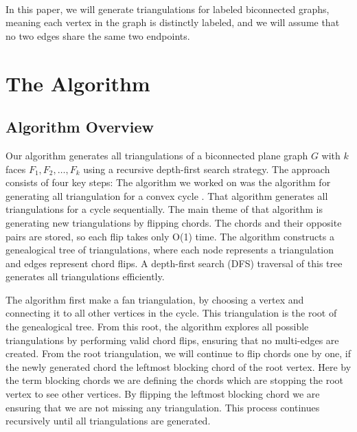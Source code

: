 ﻿﻿\documentclass[12pt,a4paper]{article}
\theoremstyle{definition}
\theoremstyle{remark}
\begin{document}
In this paper, we will generate triangulations for labeled biconnected graphs, meaning each vertex in the graph is distinctly labeled, and we will assume that no two edges share the same two endpoints.



\section{The Algorithm}
\label{sec:algorithm}
\subsection{Algorithm Overview}

Our algorithm generates all triangulations of a biconnected plane graph $G$ with $k$ faces $F_1, F_2, \ldots, F_k$ using a recursive depth-first search strategy. The approach consists of four key steps:
The algorithm we worked on was the algorithm for generating all triangulation for a convex cycle \cite{parvez2011}. That algorithm generates all triangulations for a cycle sequentially.
The main theme of that algorithm is generating new triangulations by flipping chords. The chords and their opposite pairs are stored, so each flip takes only O(1) time. The algorithm constructs a genealogical tree of triangulations, where each node represents a triangulation and edges represent chord flips. A depth-first search (DFS) traversal of this tree generates all triangulations efficiently.

The algorithm first make a fan triangulation, by choosing a vertex and connecting it to all other vertices in the cycle. This triangulation is the root of the genealogical tree. From this root, the algorithm explores all possible triangulations by performing valid chord flips, ensuring that no multi-edges are created. From the root triangulation, we will continue to flip chords one by one, if the newly generated chord the leftmost blocking chord of the root vertex. Here by the term blocking chords we are defining the chords which are stopping the root vertex to see other vertices. By flipping the leftmost blocking chord we are ensuring that we are not missing any triangulation. This process continues recursively until all triangulations are generated.
\end{document}
